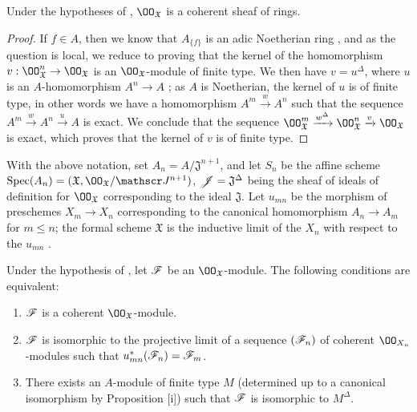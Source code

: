 \begin{prop}[10.10.3]
\label{1.10.10.3}
Under the hypotheses of , $\OO_\mathfrak{X}$ is a coherent sheaf of rings.
\end{prop}

\begin{proof}
\label{proof-1.10.10.3}
If $f\in A$, then we know that $A_{\{f\}}$ is an adic Noetherian ring , and as the question is local, we reduce  to proving that the kernel of the homomorphism $v:\OO_\mathfrak{X}^n\to\OO_\mathfrak{X}$ is an $\OO_\mathfrak{X}$-module of finite type.
We then have $v=u^\Delta$, where $u$ is an $A$-homomorphism $A^n\to A$ ; as $A$ is Noetherian, the kernel of $u$ is of finite type, in other words we have a homomorphism $A^m\xrightarrow{w}A^n$ such that the sequence $A^m\xrightarrow{w}A^n\xrightarrow{u}A$ is exact.
We conclude  that the sequence $\OO_\mathfrak{X}^m\xrightarrow{w^\Delta}\OO_\mathfrak{X}^n\xrightarrow{v}\OO_\mathfrak{X}$ is exact, which proves that the kernel of $v$ is of finite type.
\end{proof}

\begin{env}[10.10.4]
\label{1.10.10.4}
With the above notation, set $A_n=A/\mathfrak{J}^{n+1}$, and let $S_n$ be the affine scheme $\Spec(A_n)=(\mathfrak{X},\OO_\mathfrak{X}/\sh{J}^{n+1})$, $\mathscr{J}=\mathfrak{J}^\Delta$ being the sheaf of ideals of definition for $\OO_\mathfrak{X}$ corresponding to the ideal $\mathfrak{J}$.
Let $u_{mn}$ be the morphism of preschemes $X_m\to X_n$ corresponding to the canonical homomorphism $A_n\to A_m$ for $m\leq n$; the formal scheme $\mathfrak{X}$ is the inductive limit of the $X_n$ with respect to the $u_{mn}$ .
\end{env}

\begin{prop}[10.10.5]
\label{1.10.10.5}
Under the hypothesis of , let $\mathscr{F}$ be an $\OO_\mathfrak{X}$-module.
The following conditions are equivalent:
\begin{enumerate}[label=\emph{(\alph*)}]
  \item $\mathscr{F}$ is a coherent $\OO_\mathfrak{X}$-module.
  \item $\mathscr{F}$ is isomorphic to the projective limit  of a sequence $(\mathscr{F}_n)$ of coherent $\OO_{X_n}$-modules such that $u_{mn}^*(\mathscr{F}_n)=\mathscr{F}_m$.
  \item There exists an $A$-module of finite type $M$ (determined up to a canonical isomorphism by Proposition [i]) such that $\mathscr{F}$ is isomorphic to $M^\Delta$.
\end{enumerate}
\end{prop}

